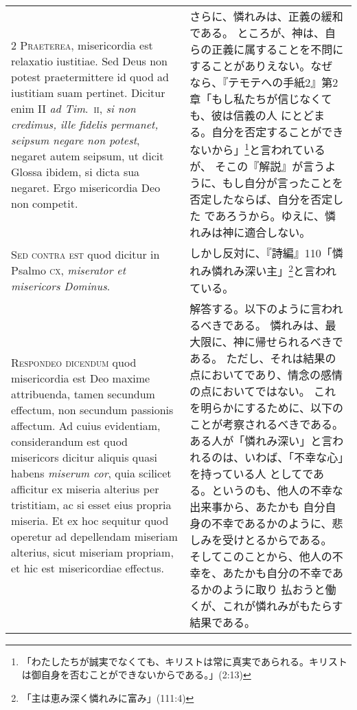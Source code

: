 \documentclass[10pt]{jsarticle} %
\begin{document}
{\begin{longtable}{p{21em}p{21em}}
{\scshape 2 Praeterea}, misericordia est relaxatio
iustitiae. Sed Deus non potest praetermittere id quod ad iustitiam suam
pertinet. Dicitur enim II {\itshape ad Tim}.~{\scshape ii}, {\itshape si non credimus, ille fidelis
permanet, seipsum negare non potest}, negaret autem seipsum, ut dicit
Glossa ibidem, si dicta sua negaret. Ergo misericordia Deo non competit.


&

さらに、憐れみは、正義の緩和である。
ところが、神は、自らの正義に属することを不問にすることがありえない。なぜ
 なら、『テモテへの手紙2』第2章「もし私たちが信じなくても、彼は信義の人
 にとどまる。自分を否定することができないから」\footnote{「わたしたちが誠実でなくても、キリストは常に真実であられる。キリストは御自身を否むことができないからである。」(2:13)}と言われているが、
そこの『解説』が言うように、もし自分が言ったことを否定したならば、自分を否定した
 であろうから。ゆえに、憐れみは神に適合しない。

\\


{\scshape Sed contra est} quod dicitur in Psalmo {\scshape cx},
{\itshape miserator et misericors Dominus}.


&


しかし反対に、『詩編』110「憐れみ憐れみ深い主」\footnote{「主は恵み深く憐れみに富み」(111:4)}と言われている。

\\


{\scshape Respondeo dicendum} quod misericordia est Deo
maxime attribuenda, tamen secundum effectum, non secundum passionis
affectum. Ad cuius evidentiam, considerandum est quod misericors dicitur
aliquis quasi habens {\itshape miserum cor}, quia scilicet afficitur ex miseria
alterius per tristitiam, ac si esset eius propria miseria. 
Et ex hoc
sequitur quod operetur ad depellendam miseriam alterius, sicut miseriam
propriam, et hic est misericordiae effectus.

&

解答する。以下のように言われるべきである。
憐れみは、最大限に、神に帰せられるべきである。
ただし、それは結果の点においてであり、情念の感情の点においてではない。
これを明らかにするために、以下のことが考察されるべきである。
ある人が「憐れみ深い」と言われるのは、いわば、「不幸な心」を持っている人
 としてである。というのも、他人の不幸な出来事から、あたかも
 自分自身の不幸であるかのように、悲しみを受けとるからである。
そしてこのことから、他人の不幸を、あたかも自分の不幸であるかのように取り
 払おうと働くが、これが憐れみがもたらす結果である。




\end{longtable}}
\end{document}
